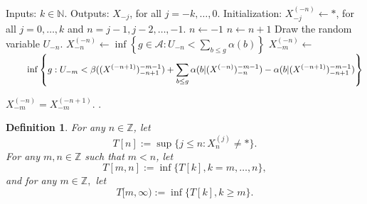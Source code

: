 \documentclass[a4paper]{article}
\newtheorem{definition}{Definition}%
\newcommand{\Z}{\mathbb{Z}}
\newcommand{\N}{\mathbb{N}}
\newcommand{\A}{\mathcal{A}}
\newcommand{\mydef}{:=}
\begin{document}
\begin{algorithm}[H]
\caption{PERFECT SIMULATION ALGORITHM TO SAMPLE $X_{-k}, \ldots,X_{0}$}
\label{algo:ps}
\begin{algorithmic}
\State Inputs:  $k \in \N$. Outputs: $X_{-j}$, for all $j={-k,\ldots,0}$.
\State Initialization: $X_{-j}^{(-n)}\leftarrow*$, for all $j={0,\ldots, k}$ and $n=j-1, j-2, \ldots, -1$.
\State $n\leftarrow -1$
\State $n\leftarrow n+1$
\State Draw the random variable $U_{-n}$.
\State $X_{-n}^{(-n)} \leftarrow \displaystyle \inf\left\{g\in \A:U_{-n} <\sum_{b\leq g}\alpha(b)\right\}$ %
\State $
X_{-m}^{(-n)} \leftarrow$ \\ $\hspace{0.8cm}\displaystyle\inf\left\{g:U_{-m} < \beta((X^{(-n+1)})^{-m-1}_{-n+1})+\sum_{b\leq g}\alpha(b|(X^{(-n)})^{-m-1}_{-n})-\alpha(b|(X^{(-n+1)})^{-m-1}_{-n+1})\right\}  
$
 

\Else
\State $X_{-m}^{(-n)}=X_{-m}^{(-n+1)}$.
\EndIf
\EndFor
\EndWhile
\State {}.
\end{algorithmic}
\end{algorithm}



\begin{definition}\label{def:T}
For any $n\in \Z$, let
\begin{equation}\label{eq:Tn}
T[n]:=\sup\{j\leq n: X_n^{(j)}\neq *\}.
\end{equation}
For any $m,n\in \Z$ such that $m<n$, let
$$
T[m,n]\mydef\inf\{T[k],k=m,\ldots,n\} ,
$$
and for any $ m \in \Z,$ let
$$
T[m, \infty)  \mydef\inf\{T[k],k \geq m \}.
$$  
\end{definition}
\end{document}
